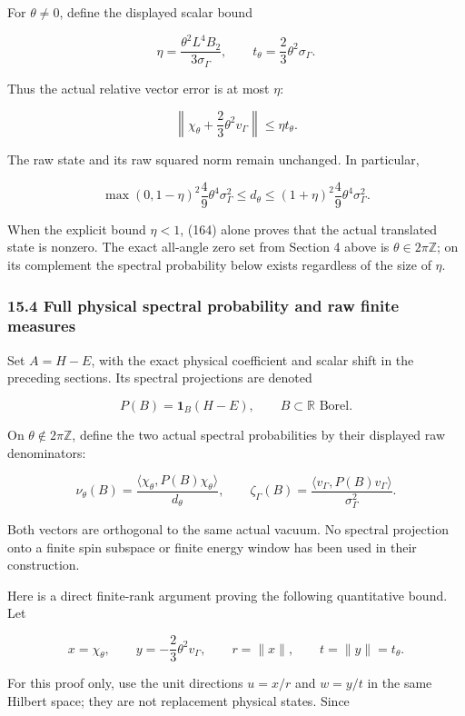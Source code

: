 \documentclass[
  11pt,
]{article}
\begin{document}
For \(\theta\ne0\), define the displayed scalar bound

\[
 \eta=\frac{\theta^2L^4B_2}{3\sigma_\Gamma},\qquad
 t_\theta=\frac23\theta^2\sigma_\Gamma.
\tag{162}
\]

Thus the actual relative vector error is at most \(\eta\):

\[
 \left\|\chi_\theta+\frac23\theta^2v_\Gamma\right\|
 \le\eta t_\theta.
\tag{163}
\]

The raw state and its raw squared norm remain unchanged. In particular,

\[
 \max(0,1-\eta)^2\frac49\theta^4\sigma_\Gamma^2
 \le d_\theta
 \le(1+\eta)^2\frac49\theta^4\sigma_\Gamma^2.
\tag{164}
\]

When the explicit bound \(\eta<1\), (164) alone proves that the actual
translated state is nonzero. The exact all-angle zero set from Section 4
above is \(\theta\in2\pi\mathbb Z\); on its complement the spectral
probability below exists regardless of the size of \(\eta\).

\subsubsection{15.4 Full physical spectral probability and raw finite
measures}\label{full-physical-spectral-probability-and-raw-finite-measures}

Set \(A=H-E\), with the exact physical coefficient and scalar shift in
the preceding sections. Its spectral projections are denoted

\[
 P(B)=\mathbf1_B(H-E),\qquad B\subset\mathbb R\text{ Borel}.
\]

On \(\theta\notin2\pi\mathbb Z\), define the two actual spectral
probabilities by their displayed raw denominators:

\[
 \nu_\theta(B)=\frac{\langle\chi_\theta,P(B)\chi_\theta\rangle}{d_\theta},
 \qquad
 \zeta_\Gamma(B)=\frac{\langle v_\Gamma,P(B)v_\Gamma\rangle}
                          {\sigma_\Gamma^2}.
\tag{165}
\]

Both vectors are orthogonal to the same actual vacuum. No spectral
projection onto a finite spin subspace or finite energy window has been
used in their construction.

Here is a direct finite-rank argument proving the following quantitative
bound. Let

\[
 x=\chi_\theta,\qquad y=-\frac23\theta^2v_\Gamma,
 \qquad r=\|x\|,\qquad t=\|y\|=t_\theta.
\]

For this proof only, use the unit directions \(u=x/r\) and \(w=y/t\) in
the same Hilbert space; they are not replacement physical states. Since
\end{document}
